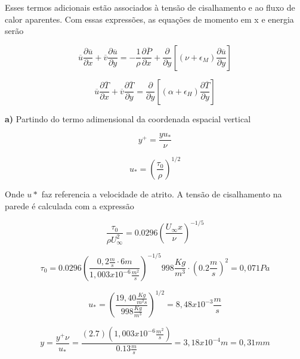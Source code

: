 \documentclass[12pt]{article}
\begin{document}
Esses termos adicionais estão associados à tensão de cisalhamento  e ao fluxo de calor aparentes. Com essas expressões, as equações de momento em x e energia serão

\begin{equation}
	\overline{u} \frac{\partial \overline{u}}{\partial x} + \overline{v} \frac{\partial \overline{u}}{\partial y} = - \frac{1}{\rho} \frac{\partial \overline{P}}{\partial x} + \frac{\partial}{\partial y} \left[ \left( \nu + \epsilon_M \right) \frac{\partial \overline{u}}{\partial y} \right]
\end{equation}

\begin{equation}
	\overline{u} \frac{\partial \overline{T}}{\partial x} + \overline{v} \frac{\partial \overline{T}}{\partial y} = \frac{\partial}{\partial y} \left[ \left( \alpha + \epsilon_H \right) \frac{\partial \overline{T}}{\partial y} \right]
\end{equation}

\textbf{a)} Partindo do termo adimensional da coordenada espacial vertical

\begin{equation}
	y^+ = \frac{y u_*}{\nu}
\end{equation}

\begin{equation}
	u_* = \left( \frac{\tau_0}{\rho} \right)^{1/2}
\end{equation}

Onde $u*$ faz referencia a velocidade de atrito. A tensão de cisalhamento na parede é calculada com a expressão

\begin{equation}
	\frac{\tau_0}{\rho U_\infty^2} = 0.0296 \left( \frac{U_\infty x}{\nu} \right)^{-1/5}
\end{equation}

\begin{equation}
	\tau_0 =  0.0296 \left( \frac{0,2 \frac{m}{s} \cdotp 6m}{1,003 x 10^{-6}\frac{m^2}{s}} \right)^{-1/5} 998\frac{Kg}{m^3}\cdotp (0.2\frac{m}{s})^2 = 0,071 Pa
\end{equation}

\begin{equation}
	u_* = \left( \frac{19,40 \frac{Kg}{m^2s}}{ 998\frac{Kg}{m^3}} \right)^{1/2} = 8,48x10^{-3}\frac{m}{s} 
\end{equation}

\begin{equation}
	y = \frac{y^+ \nu}{u_*} = \frac{(2.7)(1,003 x 10^{-6}\frac{m^2}{s})}{0.13 \frac{m}{s}} = 3,18x10^{-4}m = 0,31mm
\end{equation}
\end{document}
